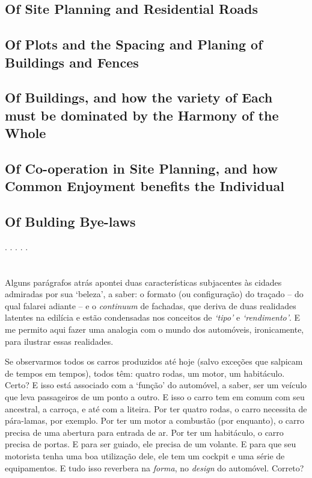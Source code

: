 \documentclass[12pt, a4paper]{book} %
\begin{document}
        \subsection*{Of Site Planning and Residential Roads}
        \subsection*{Of Plots and the Spacing and Planing of Buildings and Fences}
        \subsection*{Of Buildings, and how the variety of Each must be dominated by the Harmony of the Whole}
        \subsection*{Of Co-operation in Site Planning, and how Common Enjoyment benefits the Individual}
        \subsection*{Of Bulding Bye-laws}

        \begin{center}
            . . . . .
        \end{center} 

            \section{}%
            Alguns parágrafos atrás apontei duas características subjacentes às cidades admiradas por sua `beleza', a saber: o formato (ou configuração) do traçado – do qual falarei adiante – e o \textit{continuum} de fachadas, que deriva de duas realidades latentes na edilícia e estão condensadas nos conceitos de \emph{`tipo'} e \emph{`rendimento'}. E me permito aqui fazer uma analogia com o mundo dos automóveis, ironicamente, para ilustrar essas realidades.

            Se observarmos todos os carros produzidos até hoje (salvo exceções que salpicam de tempos em tempos), todos têm: quatro rodas, um motor, um habitáculo. Certo? E isso está associado com a `função' do automóvel, a saber, ser um veículo que leva passageiros de um ponto a outro. E isso o carro tem em comum com seu ancestral, a carroça, e até com a liteira. Por ter quatro rodas, o carro necessita de pára-lamas, por exemplo. Por ter um motor a combustão (por enquanto), o carro precisa de uma abertura para entrada de ar. Por ter um habitáculo, o carro precisa de portas. E para ser guiado, ele precisa de um volante. E para que seu motorista tenha uma boa utilização dele, ele tem um cockpit e uma série de equipamentos. E tudo isso reverbera na \textit{forma}, no \textit{design} do automóvel. Correto? 
\end{document}
